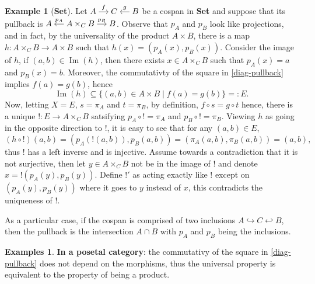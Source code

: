 \documentclass{article}
\theoremstyle{definition}
\newtheorem{exmp}[thm]{Example}
\newtheorem{exmps}[thm]{Examples}
\theoremstyle{remark}
\DeclareMathOperator{\im}{Im}
\begin{document}
\begin{exmp}[\textbf{Set}]
    Let $\begin{tikzcd}[cramped, sep=small] A \arrow[r, "f"] & C & B \arrow[l, "g"'] \end{tikzcd}$ be a cospan in \textbf{Set} and suppose that its pullback is $\begin{tikzcd}[cramped, sep=small] A & A \times_C B \arrow[l, "p_A"'] \arrow[r, "p_B"]& B\end{tikzcd}$. Observe that $p_A$ and $p_B$ look like projections, and in fact, by the universality of the product $A \times B$, there is a map $h: A\times_C B \rightarrow A \times B$ such that $h(x) = (p_A(x), p_B(x))$. Consider the image of $h$, if $(a,b) \in \im(h)$, then there exists $x \in A \times_C B$ such that $p_A(x) = a$ and $p_B(x) = b$. Moreover, the commutativty of the square in \eqref{diag-pullback} implies $f(a) = g(b)$, hence \[\im(h) \subseteq \{(a,b) \in A \times B \mid f(a) = g(b)\} =: E.\]
    Now, letting $X= E$, $s = \pi_A$ and $t = \pi_B$, by definition, $f \circ s = g \circ t$ hence, there is a unique $!: E \rightarrow A\times_C B$ satsifying $p_A \circ ! = \pi_A$ and $p_B \circ ! = \pi_B$. Viewing $h$ as going in the opposite direction to $!$, it is easy to see that for any $(a,b) \in E$, \[(h\circ!)(a,b) = (p_A(!(a,b)), p_B(a,b)) = (\pi_A(a,b), \pi_B(a,b)) = (a,b),\] thus $!$ has a left inverse and is injective. Assume towards a contradiction that it is not surjective, then let $y \in A\times_C B$ not be in the image of $!$ and denote $x = !(p_A(y), p_B(y))$. Define $!'$ as acting exactly like $!$ except on $(p_A(y),p_B(y))$ where it goes to $y$ instead of $x$, this contradicts the uniqueness of $!$.

    As a particular case, if the cospan is comprised of two inclusions $A \hookrightarrow C \hookleftarrow B$, then the pullback is the intersection $A \cap B$ with $p_A$ and $p_B$ being the inclusions.
\end{exmp}
\begin{exmps}
    \textbf{In a posetal category}: the commutativy of the square in \eqref{diag-pullback} does not depend on the morphisms, thus the universal property is equivalent to the property of being a product.
\end{exmps}
\end{document}
